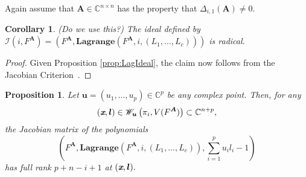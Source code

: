 \documentclass[a4paper]{article}
\def\sI{\mathscr{I}}
\def\mA{{\bm A}}
\def\ub{{\bm u}}
\def\lb{{\bm l}}
\def\xb{\textit{\textbf{x}}}
\def\C{\mathbb{C}}
\def\lagFA{{\bm{Lagrange}}(F^{\mA},i,(L_1,\hdots,L_c))}
\def\udl{\sum_{i=1}^pu_il_i}
\newtheorem{corollary}[theorem]{Corollary}
\newtheorem{prop}[theorem]{Proposition}
\begin{document}
    Again assume that $\mA \in \C^{n \times n}$ has the property that $\Delta_{i,1}(\mA) \not = 0.$    
    \begin{corollary} (Do we use this?)
     The ideal defined by $\sI(i,F^{\mA}) = \left(F^{\mA},\lagFA\right)$ is radical.
    \end{corollary}
    \begin{proof}
    Given Proposition \ref{prop:LagIdeal}, the claim now follows from the Jacobian Criterion~\cite[Corollary 16.20]{ECA}.
    \end{proof}
    \begin{prop}\label{prop:RadLagPolarV}
     Let $\ub = (u_1,\hdots,u_p) \in \C^p$ be any complex point. Then, for any \[(\xb,\lb)\in \mathscr{W}_{\ub}\left(\pi_i,V(F^{\mA})\right) \subset \C^{n+p},\] the Jacobian matrix of the polynomials
     \[
    \left( F^{\mA},\lagFA,\udl-1\right) 
    \]
 has full rank $p+n-i+1$ at $(\xb,\lb).$ 
    \end{prop}
\end{document}

